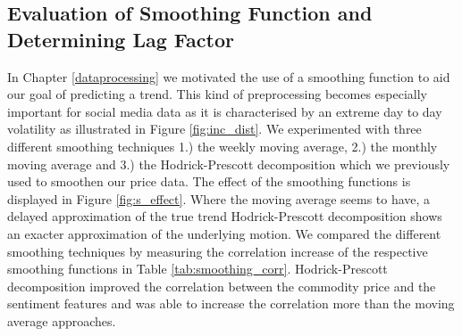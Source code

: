 \subsection{Evaluation of Smoothing Function and Determining Lag Factor }

In Chapter \ref{dataprocessing} we motivated the use of a smoothing function to aid our goal of predicting a trend. This kind of preprocessing becomes especially important for social media data as it is characterised by an extreme day to day volatility as illustrated in Figure \ref{fig:inc_dist}. We experimented with three different smoothing techniques 1.) the weekly moving average, 2.) the monthly moving average and 3.) the Hodrick-Prescott decomposition which we previously used to smoothen our price data. The effect of the smoothing functions is displayed in Figure \ref{fig:s_effect}. Where the moving average seems to have, a delayed approximation of the true trend Hodrick-Prescott decomposition shows an exacter approximation of the underlying motion. We compared the different smoothing techniques by measuring the correlation increase of the respective smoothing functions in Table \ref{tab:smoothing_corr}. Hodrick-Prescott decomposition improved the correlation between the commodity price and the sentiment features and was able to increase the correlation more than the moving average approaches. 




